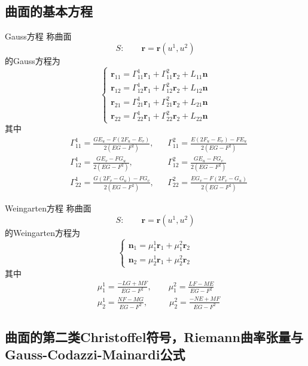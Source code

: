 \documentclass[lang = cn, scheme = chinese, thmcnt = section]{elegantbook}
\newcommand{\bs}{\boldsymbol}          %
\begin{document}
\subsection{曲面的基本方程}

\begin{definition}{Gauss方程}
	称曲面%
	$$
	S:\qquad \bs{r}=\bs{r}(u^1,u^2)
	$$
	的Gauss方程为%
	$$
	\begin{cases}
		\bs{r}_{11}=\Gamma_{11}^{1}\bs{r}_1+\Gamma_{11}^{2}\bs{r}_2+L_{11}\bs{n}\\
		\bs{r}_{12}=\Gamma_{12}^{1}\bs{r}_1+\Gamma_{12}^{2}\bs{r}_2+L_{12}\bs{n}\\
		\bs{r}_{21}=\Gamma_{21}^{1}\bs{r}_1+\Gamma_{21}^{2}\bs{r}_2+L_{21}\bs{n}\\
		\bs{r}_{22}=\Gamma_{22}^{1}\bs{r}_1+\Gamma_{22}^{2}\bs{r}_2+L_{22}\bs{n}
	\end{cases}
	$$
	其中
	\begin{align*}
		& \Gamma_{11}^{1}=\frac{GE_u-F(2F_u-E_v)}{2(EG-F^2)},
		&& \Gamma_{11}^{2}=\frac{E(2F_u-E_v)-FE_u}{2(EG-F^2)}\\
		& \Gamma_{12}^{1}=\frac{GE_v-FG_u}{2(EG-F^2)},
		&&\Gamma_{12}^{2}=\frac{GE_u-FG_v}{2(EG-F^2)}\\
		& \Gamma_{22}^{1}=\frac{G(2F_v-G_u)-FG_v}{2(EG-F^2)},
		&& \Gamma_{22}^{2}=\frac{EG_v-F(2F_v-G_u)}{2(EG-F^2)}
	\end{align*}
\end{definition}

\begin{definition}{Weingarten方程}
	称曲面%
	$$
	S:\qquad \bs{r}=\bs{r}(u^1,u^2)
	$$
	的Weingarten方程为
	$$
	\begin{cases}
		\bs{n}_1=\mu_1^1\bs{r}_1+\mu_1^2\bs{r}_2\\
		\bs{n}_2=\mu_2^1\bs{r}_1+\mu_2^2\bs{r}_2
	\end{cases}
	$$
	其中
	\begin{align*}
		& \mu_1^1=\frac{-LG+MF}{EG-F^2},\qquad
		\mu_1^2=\frac{LF-ME}{EG-F^2}\\
		& \mu_2^1=\frac{NF-MG}{EG-F^2},\qquad
		\;\;\mu_2^2=\frac{-NE+MF}{EG-F^2}
	\end{align*}
\end{definition}

\subsection{曲面的第二类Christoffel符号，Riemann曲率张量与Gauss-Codazzi-Mainardi公式}
\end{document}
